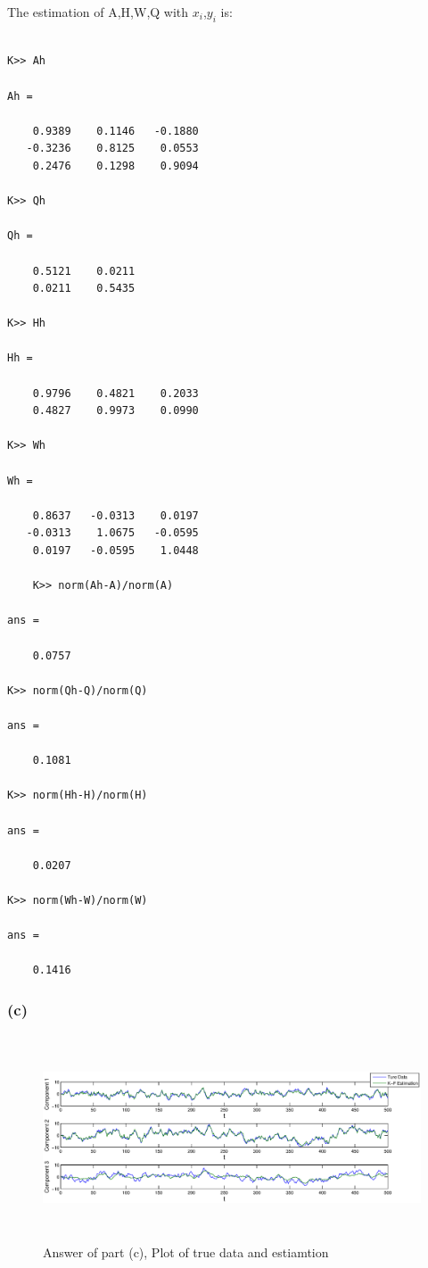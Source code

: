 \documentclass[14pt,letterpaper] {article}
\begin{document}
The estimation of A,H,W,Q with $x_i$,$y_i$ is: \\

\begin{lstlisting}

K>> Ah

Ah =

    0.9389    0.1146   -0.1880
   -0.3236    0.8125    0.0553
    0.2476    0.1298    0.9094

K>> Qh

Qh =

    0.5121    0.0211
    0.0211    0.5435

K>> Hh

Hh =

    0.9796    0.4821    0.2033
    0.4827    0.9973    0.0990

K>> Wh

Wh =

    0.8637   -0.0313    0.0197
   -0.0313    1.0675   -0.0595
    0.0197   -0.0595    1.0448
    
    K>> norm(Ah-A)/norm(A)

ans =

    0.0757

K>> norm(Qh-Q)/norm(Q)

ans =

    0.1081

K>> norm(Hh-H)/norm(H)

ans =

    0.0207

K>> norm(Wh-W)/norm(W)

ans =

    0.1416

\end{lstlisting}

\subsubsection{(c)}

\begin{figure}
\begin{center}
\includegraphics[width=5.4in, height=2.4in]{partc.eps}
\caption{Answer of part (c), Plot of true data and estiamtion}
\end{center}
\end{figure}
\end{document}
